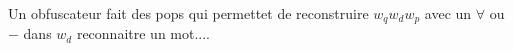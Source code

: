 \documentclass{article}
\begin{document}
Un obfuscateur fait des pops qui permettet de reconstruire  $w_qw_dw_p$ avec un $\forall$ ou $-$ dans $w_d$
reconnaitre un mot.... 
%	
\end{document}
